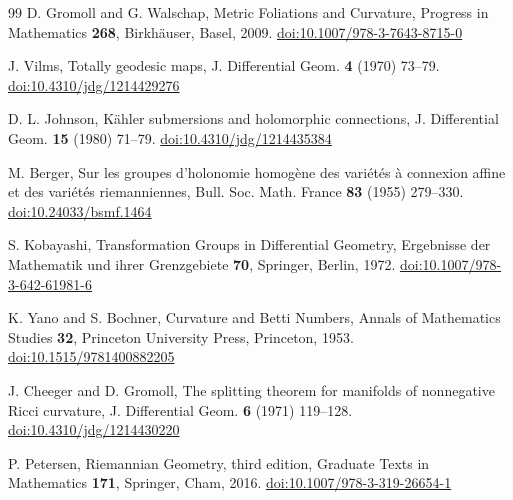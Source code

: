 \documentclass[11pt,reqno]{amsart}
\theoremstyle{plain}
\theoremstyle{definition}
\begin{document}
\begin{thebibliography}{99}
 D. Gromoll and G. Walschap, Metric Foliations and Curvature, Progress in Mathematics \textbf{268}, Birkh\"auser, Basel, 2009. \href{https://doi.org/10.1007/978-3-7643-8715-0}{doi:10.1007/978-3-7643-8715-0}

 J. Vilms, Totally geodesic maps, J. Differential Geom. \textbf{4} (1970) 73--79. \href{https://doi.org/10.4310/jdg/1214429276}{doi:10.4310/jdg/1214429276}

 D. L. Johnson, K\"ahler submersions and holomorphic connections, J. Differential Geom. \textbf{15} (1980) 71--79. \href{https://doi.org/10.4310/jdg/1214435384}{doi:10.4310/jdg/1214435384}

 M. Berger, Sur les groupes d'holonomie homog\`ene des vari\'et\'es \`a connexion affine et des vari\'et\'es riemanniennes, Bull. Soc. Math. France \textbf{83} (1955) 279--330. \href{https://doi.org/10.24033/bsmf.1464}{doi:10.24033/bsmf.1464}

 S. Kobayashi, Transformation Groups in Differential Geometry, Ergebnisse der Mathematik und ihrer Grenzgebiete \textbf{70}, Springer, Berlin, 1972. \href{https://doi.org/10.1007/978-3-642-61981-6}{doi:10.1007/978-3-642-61981-6}

 K. Yano and S. Bochner, Curvature and Betti Numbers, Annals of Mathematics Studies \textbf{32}, Princeton University Press, Princeton, 1953. \href{https://doi.org/10.1515/9781400882205}{doi:10.1515/9781400882205}

 J. Cheeger and D. Gromoll, The splitting theorem for manifolds of nonnegative Ricci curvature, J. Differential Geom. \textbf{6} (1971) 119--128. \href{https://doi.org/10.4310/jdg/1214430220}{doi:10.4310/jdg/1214430220}

 P. Petersen, Riemannian Geometry, third edition, Graduate Texts in Mathematics \textbf{171}, Springer, Cham, 2016. \href{https://doi.org/10.1007/978-3-319-26654-1}{doi:10.1007/978-3-319-26654-1}

\end{thebibliography}
\end{document}
